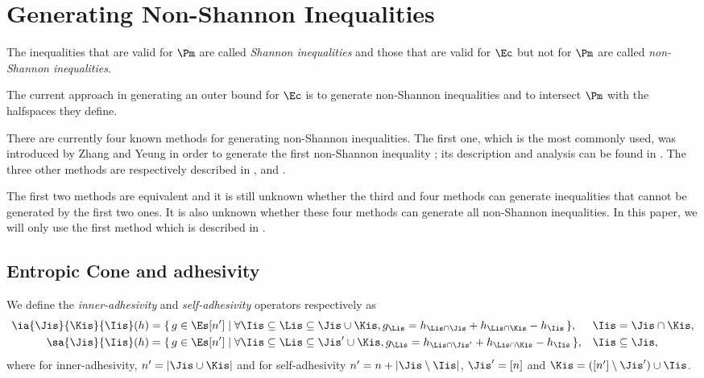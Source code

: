 \documentclass[12pt]{article}
\begin{document}
\section{Generating Non-Shannon Inequalities}
\label{sec:review}
The inequalities that are valid for $\Pm$ are called \emph{Shannon inequalities}
and those that are valid for $\Ec$ but not for $\Pm$ are called \emph{non-Shannon inequalities}.

The current approach in generating an outer bound for $\Ec$ is
to generate non-Shannon inequalities and to intersect $\Pm$ with the halfspaces they define.

There are currently four known methods for generating non-Shannon inequalities.
The first one, which is the most commonly used,
was introduced by Zhang and Yeung in order to generate the first non-Shannon inequality \cite{zhang1998characterization}; its description and analysis can be found in \cite{matus2007adhesivity}.
The three other methods are respectively described in
\cite{makarychev2002new},
\cite{matus2007two} and
\cite{csirmaz2014book}.

The first two methods are equivalent \cite{kaced2013equivalence}
and it is still unknown whether the third and four methods can generate inequalities that cannot be generated by the first two ones.
It is also unknown whether these four methods can generate all non-Shannon inequalities.
In this paper, we will only use the first method which is described in .

\subsection{Entropic Cone and adhesivity}
\label{sec:adh}
We define the \emph{inner-adhesivity} and \emph{self-adhesivity} operators respectively as
\begin{align*}
  \ia{\Jis}{\Kis}{\Iis}(h) & = \{\, g \in \Es[n'] \mid \forall \Iis \subseteq \Lis \subseteq \Jis \cup \Kis, g_{\Lis} = h_{\Lis \cap \Jis} + h_{\Lis \cap \Kis} - h_{\Iis} \,\}, & \Iis & = \Jis \cap \Kis,\\
  \sa{\Jis}{\Iis}(h) & = \{\, g \in \Es[n'] \mid \forall \Iis \subseteq \Lis \subseteq \Jis' \cup \Kis, g_{\Lis} = h_{\Lis \cap \Jis'} + h_{\Lis \cap \Kis} - h_{\Iis} \,\}, & \Iis & \subseteq \Jis,
\end{align*}
where for inner-adhesivity, $n' = |\Jis\cup\Kis|$ and for self-adhesivity $n' = n + |\Jis \setminus \Iis|$, $\Jis' = [n]$ and $\Kis = ([n'] \setminus \Jis') \cup \Iis$.
\end{document}
